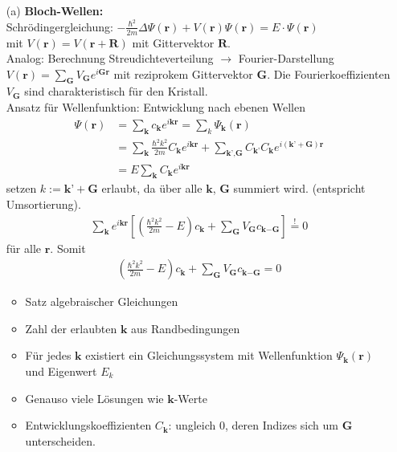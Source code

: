 \begin{itemize}
    \item[(a)] \textbf{Bloch-Wellen:}\\
    Schrödingergleichung: $-\frac{\hbar^2}{2m} \Delta \Psi(\textbf{r}) + V(\textbf{r}) \Psi(\textbf{r}) = E \cdot \Psi(\textbf{r})$\\
    mit $V(\textbf{r}) = V(\textbf{r} + \textbf{R})$ mit Gittervektor $\textbf{R}$.\\
    Analog: Berechnung Streudichteverteilung $\rightarrow$ Fourier-Darstellung $V(\textbf{r}) = \sum_{\textbf{G}} V_{\textbf{G}} e^{i \textbf{G} \textbf{r}}$ mit reziprokem Gittervektor $ \textbf{G}$. Die Fourierkoeffizienten $V_{\textbf{G}}$ sind charakteristisch für den Kristall. \\
    Ansatz für Wellenfunktion: Entwicklung nach ebenen Wellen
    \begin{align}
        \Psi(\textbf{r}) &= \sum_{\textbf{k}} c_{\textbf{k}} e^{i \textbf{k} \textbf{r}} = \sum_k \Psi_{\textbf{k}}(\textbf{r}) \\
        &=\sum_{\textbf{k}} \frac{\hbar^2 k^2}{2m} C_{\textbf{k}} e^{i \textbf{k} \textbf{r}} + \sum_{\textbf{k'},\textbf{G}} C_{\textbf{k'}} C_{\textbf{k}} e^{i (\textbf{k'} +\textbf{G}) \textbf{r}}\\
        &= E \sum_{\textbf{k}} C_{\textbf{k}} e^{i \textbf{k} \textbf{r}}
    \end{align}
    setzen $k := \textbf{k'} + \textbf{G} $ erlaubt, da über alle $\textbf{k}$, $\textbf{G}$ summiert wird. (entspricht Umsortierung).
    \begin{align}
        \sum_{\textbf{k}} e^{i \textbf{k} \textbf{r}} \left[\left(\frac{\hbar^2k^2}{2m} - E\right)c_{\textbf{k}} + \sum_{\textbf{G}} V_{\textbf{G}} c_{\textbf{k}-\textbf{G}}\right] \overset{!}{=} 0
    \end{align}
    für alle $\textbf{r}$. Somit
    \begin{align}
        \left(\frac{\hbar^2k^2}{2m} - E\right)c_{\textbf{k}} + \sum_{\textbf{G}} V_{\textbf{G}} c_{\textbf{k}-\textbf{G}} = 0
    \end{align}

    \begin{itemize}
        \item Satz algebraischer Gleichungen
        \item Zahl der erlaubten $\textbf{k}$ aus Randbedingungen
        \item Für jedes $\textbf{k}$ existiert ein Gleichungssystem mit Wellenfunktion $\Psi_{\textbf{k}}(\textbf{r})$ und Eigenwert $E_{k}$
        \item Genauso viele Lösungen wie $\textbf{k}$-Werte
        \item Entwicklungskoeffizienten $C_{\textbf{k}}$: ungleich 0, deren Indizes sich um $\textbf{G}$ unterscheiden.
    \end{itemize}


\end{itemize}
